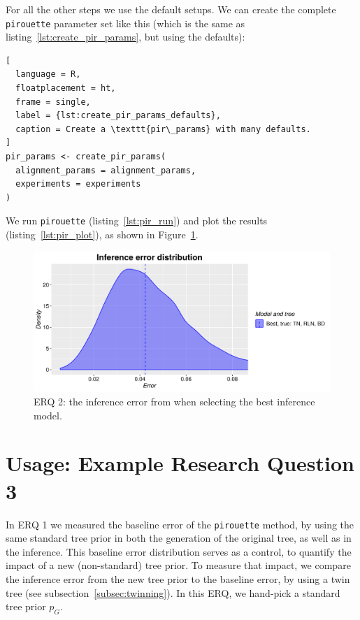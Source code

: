 For all the other steps we use the default setups. 
We can create the complete
\verb;pirouette; parameter set like this (which is the
same as listing~\ref{lst:create_pir_params}, but using the defaults):

\begin{lstlisting}[
  language = R,
  floatplacement = ht,
  frame = single,
  label = {lst:create_pir_params_defaults},
  caption = Create a \texttt{pir\_params} with many defaults.
]
pir_params <- create_pir_params(
  alignment_params = alignment_params,
  experiments = experiments
)
\end{lstlisting}

We run \verb;pirouette; (listing~\ref{lst:pir_run}) 
and plot the results (listing~\ref{lst:pir_plot}),
as shown in Figure~\ref{fig:example_2}.

\begin{figure}[H]
  \includegraphics[width=\textwidth]{example_2/errors.png}
  \caption{
    ERQ 2: the inference error from
    when selecting the best inference model.
  }
  \label{fig:example_2}
\end{figure}

\section{Usage: Example Research Question 3}

In ERQ 1 we measured the baseline error of the \verb;pirouette; method,
by using the same standard tree prior in both the generation of 
the original tree, as well as in the inference.
This baseline error distribution serves as a control,
to quantify the impact of a new (non-standard) tree prior.
To measure that impact, we compare the inference error 
from the new tree prior to the baseline error,
by using a twin tree (see subsection~\ref{subsec:twinning}).
In this ERQ, we hand-pick a standard tree prior $\mathit{p_{G}}$.

